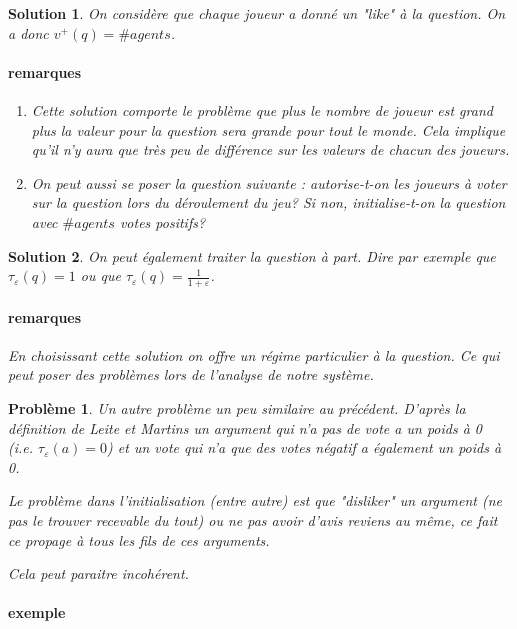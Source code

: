 \documentclass[12pt]{article}
\theoremstyle{defi}
\theoremstyle{not}
\theoremstyle{prob}
\newtheorem{problem}{Problème}
\newtheorem{solution}{Solution}
\begin{document}
\begin{solution}
  On considère que chaque joueur a donné un "like" à la question. On a donc $v^+(q) = \#agents$.

  \paragraph{remarques}
    \begin{enumerate}
      \item Cette solution comporte le problème que plus le nombre de joueur est grand plus la valeur pour la question sera grande pour tout le monde. Cela implique qu'il n'y aura que très peu de différence sur les valeurs de chacun des joueurs.

      \item On peut aussi se poser la question suivante : autorise-t-on les joueurs à voter sur la question lors du déroulement du jeu? Si non, initialise-t-on la question avec $\#agents$ votes positifs?
    \end{enumerate}
\end{solution}

\begin{solution}
  On peut également traiter la question à part. Dire par exemple que $\tau_\varepsilon(q) = 1$ ou que $\tau_\varepsilon(q) = \frac{1}{1 + \varepsilon}$.

  \paragraph{remarques}
    En choisissant cette solution on offre un régime particulier à la question. Ce qui peut poser des problèmes lors de l'analyse de notre système.
\end{solution}

\color{blue}
  \begin{problem}
    Un autre problème un peu similaire au précédent. D'après la définition de Leite et Martins un argument qui n'a pas de vote a un poids à 0 (i.e. $\tau_\varepsilon (a) = 0$) et un vote qui n'a que des votes négatif a également un poids à 0.

    Le problème dans l'initialisation (entre autre) est que "disliker" un argument (ne pas le trouver recevable du tout) ou ne pas avoir d'avis reviens au même, ce fait ce propage à tous les fils de ces arguments.

    Cela peut paraitre incohérent.

    \paragraph{exemple}

  \end{problem}
\end{document}
